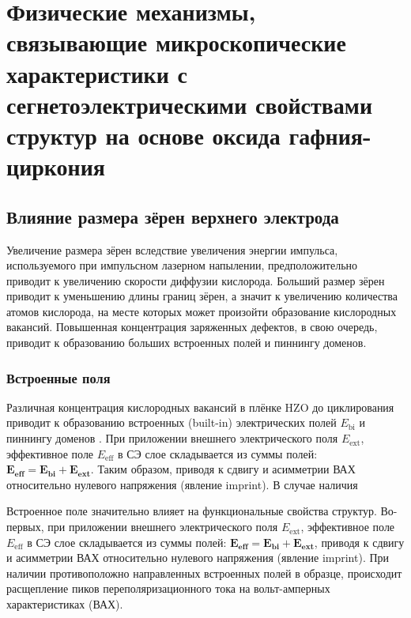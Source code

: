 \chapter{Физические механизмы, связывающие микроскопические характеристики с сегнетоэлектрическими свойствами структур на основе оксида гафния-циркония}


\section{Влияние размера зёрен верхнего электрода}

Увеличение размера зёрен вследствие увеличения энергии импульса, используемого при импульсном лазерном напылении, предположительно приводит к увеличению скорости диффузии кислорода. Больший размер зёрен приводит к уменьшению длины границ зёрен, а значит к увеличению количества атомов кислорода, на месте которых может произойти образование кислородных вакансий. Повышенная концентрация заряженных дефектов, в свою очередь, приводит к образованию больших встроенных полей и пиннингу доменов.

\subsection{Встроенные поля}

Различная концентрация кислородных вакансий в плёнке HZO до циклирования приводит к образованию встроенных (built-in) электрических полей \(E_\text{bi}\) и пиннингу доменов . При приложении внешнего электрического поля \(E_\text{ext}\), эффективное поле \(E_\text{eff}\) в СЭ слое складывается из суммы полей: \(\boldsymbol{E_\text{eff}} = \boldsymbol{E_\text{bi}} + \boldsymbol{E_\text{ext}}\). Таким образом, приводя к сдвигу и асимметрии ВАХ относительно нулевого напряжения (явление imprint). В случае наличия



Встроенное поле значительно влияет на функциональные свойства структур. Во-первых, при приложении внешнего электрического поля \(E_\text{ext}\), эффективное поле \(E_\text{eff}\) в СЭ слое складывается из суммы полей: \(\boldsymbol{E_\text{eff}} = \boldsymbol{E_\text{bi}} + \boldsymbol{E_\text{ext}}\), приводя к сдвигу и асимметрии ВАХ относительно нулевого напряжения (явление imprint). При наличии противоположно направленных встроенных полей в образце, происходит расщепление пиков переполяризационного тока на вольт-амперных характеристиках (ВАХ).

